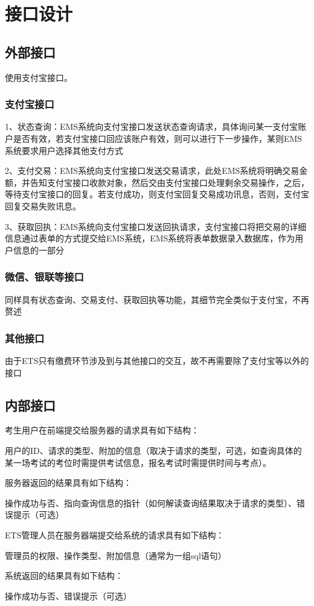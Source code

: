 \chapter{接口设计}
\section{外部接口}
使用支付宝接口。

\subsection{支付宝接口}
1、状态查询：EMS系统向支付宝接口发送状态查询请求，具体询问某一支付宝账户是否有效，若支付宝接口回应该账户有效，则可以进行下一步操作，某则EMS系统要求用户选择其他支付方式

2、支付交易：EMS系统向支付宝接口发送交易请求，此处EMS系统将明确交易金额，并告知支付宝接口收款对象，然后交由支付宝接口处理剩余交易操作，之后，等待支付宝接口的回复。若支付成功，则支付宝回复交易成功讯息，否则，支付宝回复交易失败讯息。

3、获取回执：EMS系统向支付宝接口发送回执请求，支付宝接口将把交易的详细信息通过表单的方式提交给EMS系统，EMS系统将表单数据录入数据库，作为用户信息的一部分

\subsection{微信、银联等接口}
同样具有状态查询、交易支付、获取回执等功能，其细节完全类似于支付宝，不再赘述

\subsection{其他接口}
由于ETS只有缴费环节涉及到与其他接口的交互，故不再需要除了支付宝等以外的接口


\section{内部接口}
考生用户在前端提交给服务器的请求具有如下结构：

用户的ID、请求的类型、附加的信息（取决于请求的类型，可选，如查询具体的某一场考试的考位时需提供考试信息，报名考试时需提供时间与考点）。

服务器返回的结果具有如下结构：

操作成功与否、指向查询信息的指针（如何解读查询结果取决于请求的类型）、错误提示（可选）

ETS管理人员在服务器端提交给系统的请求具有如下结构：

管理员的权限、操作类型、附加信息（通常为一组sql语句）

系统返回的结果具有如下结构：

操作成功与否、错误提示（可选）